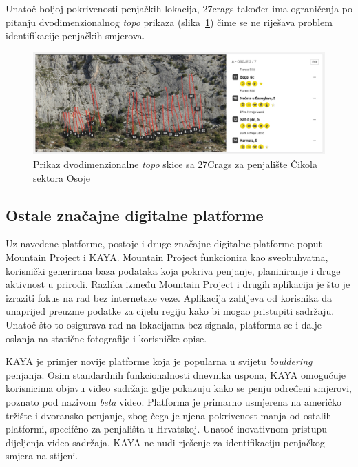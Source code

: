 Unatoč boljoj pokrivenosti penjačkih lokacija, 27crags također ima ograničenja po pitanju dvodimenzionalnog \textit{topo} prikaza (slika~\ref{fig:cikola_27crags_topo}) čime se ne riješava problem identifikacije penjačkih smjerova.

\begin{figure}[H]
    \centering
    \includegraphics[width=1\textwidth]{images/analiza/cikola_27crags_topo.jpeg}
    \caption{Prikaz dvodimenzionalne \textit{topo} skice sa 27Crags za penjalište Čikola sektora Osoje}
    \label{fig:cikola_27crags_topo}
\end{figure}

\subsection{Ostale značajne digitalne platforme}

Uz navedene platforme, postoje i druge značajne digitalne platforme poput Mountain Project i KAYA. Mountain Project funkcionira kao sveobuhvatna, korisnički generirana baza podataka koja pokriva penjanje, planiniranje i druge aktivnost u prirodi. Razlika između Mountain Project i drugih aplikacija je što je izraziti fokus na rad bez internetske veze. Aplikacija zahtjeva od korisnika da unaprijed preuzme podatke za cijelu regiju kako bi mogao pristupiti sadržaju. Unatoč što to osigurava rad na lokacijama bez signala, platforma se i dalje oslanja na statične fotografije i korisničke opise.

KAYA je primjer novije platforme koja je popularna u svijetu \textit{bouldering} penjanja. Osim standardnih funkcionalnosti dnevnika uspona, KAYA omogućuje korisnicima objavu video sadržaja gdje pokazuju kako se penju određeni smjerovi, poznato pod nazivom \textit{beta} video.  Platforma je primarno usmjerena na američko tržište i dvoransko penjanje, zbog čega je njena pokrivenost manja od ostalih platformi, specifčno za penjališta u Hrvatskoj. Unatoč inovativnom pristupu dijeljenja video sadržaja, KAYA ne nudi rješenje za identifikaciju penjačkog smjera na stijeni.


